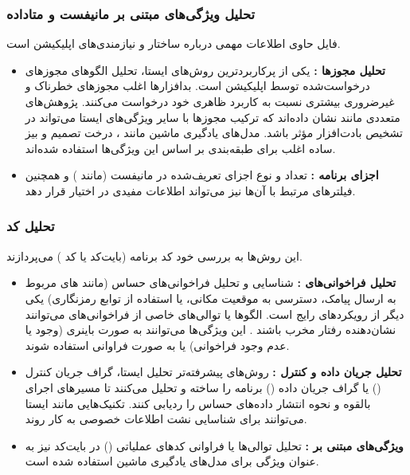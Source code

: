 \subsubsection{تحلیل ویژگی‌های مبتنی بر مانیفست و متاداده}
فایل  حاوی اطلاعات مهمی درباره ساختار و نیازمندی‌های اپلیکیشن است.
\begin{itemize}
    \item \textbf{تحلیل مجوزها :} یکی از پرکاربردترین روش‌های ایستا، تحلیل الگوهای مجوزهای درخواست‌شده توسط اپلیکیشن است. بدافزارها اغلب مجوزهای خطرناک و غیرضروری بیشتری نسبت به کاربرد ظاهری خود درخواست می‌کنند. پژوهش‌های متعددی مانند  \cite{Drebin} نشان داده‌اند که ترکیب مجوزها با سایر ویژگی‌های ایستا می‌تواند در تشخیص بادت‌افزار مؤثر باشد. مدل‌های یادگیری ماشین مانند ، درخت تصمیم و بیز ساده اغلب برای طبقه‌بندی بر اساس این ویژگی‌ها استفاده شده‌اند.
    \item \textbf{اجزای برنامه :} تعداد و نوع اجزای تعریف‌شده در مانیفست (مانند ) و همچنین فیلترهای  مرتبط با آن‌ها نیز می‌تواند اطلاعات مفیدی در اختیار قرار دهد.
\end{itemize}

\subsubsection{تحلیل کد }
این روش‌ها به بررسی خود کد برنامه (بایت‌کد  یا کد ) می‌پردازند.
\begin{itemize}
    \item \textbf{تحلیل فراخوانی‌های :} شناسایی و تحلیل فراخوانی‌های  حساس (مانند های مربوط به ارسال پیامک، دسترسی به موقعیت مکانی، یا استفاده از توابع رمزنگاری) یکی دیگر از رویکردهای رایج است. الگوها یا توالی‌های خاصی از فراخوانی‌های  می‌توانند نشان‌دهنده رفتار مخرب باشند \cite{Yuan2014}. این ویژگی‌ها می‌توانند به صورت باینری (وجود یا عدم وجود فراخوانی) یا به صورت فراوانی استفاده شوند.
    \item \textbf{تحلیل جریان داده و کنترل :} روش‌های پیشرفته‌تر تحلیل ایستا، گراف جریان کنترل () یا گراف جریان داده () برنامه را ساخته و تحلیل می‌کنند تا مسیرهای اجرای بالقوه و نحوه انتشار داده‌های حساس را ردیابی کنند. تکنیک‌هایی مانند  ایستا می‌توانند برای شناسایی نشت اطلاعات خصوصی به کار روند.
    \item \textbf{ویژگی‌های مبتنی بر :} تحلیل توالی‌ها یا فراوانی کدهای عملیاتی () در بایت‌کد نیز به عنوان ویژگی برای مدل‌های یادگیری ماشین استفاده شده است.
\end{itemize}

